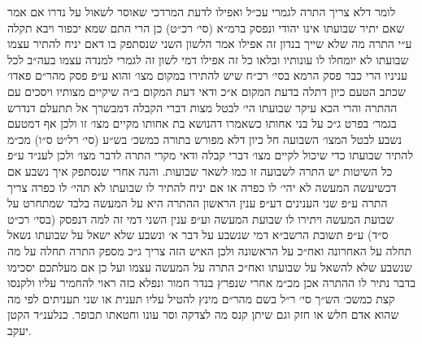 \documentclass[12pt, openany]{book}
\begin{document}
\begin{multicols}{2}
לומר דלא צריך התרה לגמרי עכ״ל ואפילו לדעת המרדכי שאוסר לשאול על נדרו אם אמר שאם יתיר שבועתו אינו יהודי ונפסק ברמ״א (סי׳ רכ״ט) כן הרי התם שמא יכפור ויבא תקלה ע״י התרה מה שלא שייך בנדון זה אפילו אמר הלשון השני שנסתפק בו דאם יניח להתיר עצמו שבועתו לא יומחלו לו עונותיו ובלאו כל זה אפילו דמי לשון זה לגמרי למנדה עצמו בעה״ב לכל עניניו הרי כבר פסק הרמא בסי׳ רכ״ח שיש להתירו במקום מצו׳ והוא ע״פ פסק מהר״ם פאדו׳ שכתב הטעם כיון דתלה בדעת המקום א״כ ודאי דעת המקום ב״ה שיקיים מצותיו ויסכים עם ההתרה והרי הכא עיקר שבועתו הי׳ לבטל מצות דברי הקבלה דמבשרך אל תתעלם דנדרש בגמר׳ בפרט ג״כ על בני אחותו כשאמרו דהנושא בת אחותו מקיים מצו׳ זו ולכן אף דמטעם נשבע לבטל המצו׳ השבועה חל כיון דלא מפורש בתורה כמשכ׳ בש״ע (סי׳ רל״ט ס״ו) מכ״מ להתיר שבועתו כדי שיכול לקיים מצו׳ דברי קבלה ודאי מקרי התרה לדבר מצו׳ ולכן לענ״ד ע״פ כל השיטות יש התרה לשבועה זו כמו לשאר שבועות. והנה אחרי שנסתפק איך נשבע אם דכשיעשה המעשה לא יהי׳ לו כפרה או אם יניח להתיר לו שבועתו לא תהי׳ לו כפרה צריך התרה ע״פ שני הענינים דע״פ ענין הראשון ההתרה היא על המעשה בלבד שמתחרט על שבועת המעשה ויתירו לו שבועת המעשה וע״פ ענין השני דמי זה למה דנפסק (בסי׳ רכ״ט ס״ד) ע״פ תשובת הרשב״א דמי שנשבע על דבר א׳ ונשבע שלא ישאל על שבועתו נשאל תחלה על האחרונה ואח״כ על הראשונה ולכן האיש הזה צריך ג״כ מספק התרה תחלה על מה שנשבע שלא להשאל על שבועתו ואח״כ התרה על המעשה עצמו ועל כן אם מעלתכם יסכימו בדבר נתיר לו ההתרה אכן מכ״מ אחרי שנפרץ בנדר חמור ונפלא כזה ראוי להחמיר עליו ולקנסו קצת כמשכ׳ הש״ך סי׳ ר״ל בשם מהר״ם מינץ להטיל עליו תענית או שני תעניתים לפי מה שהוא אדם חלש או חזק וגם שיתן קנס מה לצדקה וסר עונו וחטאתו תכופר. כנלענ״ד הקטן יעקב.\\\vspace{0pt}

\end{multicols}\newpage
\end{document}
